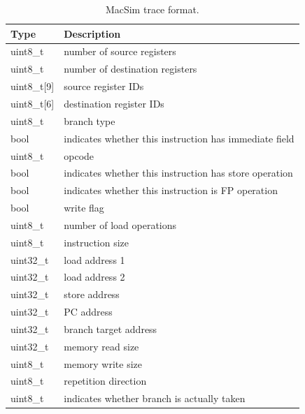 

\ignore
		{
		\begin{table}[htb]
		\begin{footnotesize}
		\begin{center}
		\caption{MacSim trace format.}
		\label{table:trace_format}
		\begin{tabular}{|l|l|} 
		\hline
		Type               & Description \\ \hline 
		uint8\_t           & number of source registers \\ \hline
		uint8\_t           & number of destination registers \\ \hline
		uint8\_t[9]        & source register IDs \\ \hline
		uint8\_t[6]        & destination register IDs \\ \hline
		uint8\_t           & branch type \\ \hline
		bool               & indicates whether this instruction has immediate field \\ \hline
		uint8\_t           & opcode \\ \hline
		bool               & indicates whether this instruction has store operation \\ \hline
		bool               & indicates whether this instruction is FP operation \\ \hline
		bool               & write flag \\ \hline
		uint8\_t           & number of load operations \\ \hline
		uint8\_t           & instruction size \\ \hline
		uint32\_t          & load address 1 \\ \hline
		uint32\_t          & load address 2 \\ \hline
		uint32\_t          & store address \\ \hline
		uint32\_t          & PC address \\ \hline
		uint32\_t          & branch target address \\ \hline
		uint32\_t          & memory read size \\ \hline
		uint8\_t           & memory write size \\ \hline
		uint8\_t           & repetition direction  \\ \hline
		uint8\_t           & indicates whether branch is actually taken \\ \hline

		\end{tabular}
		\end{center}
		\end{footnotesize}
		\end{table}
		}

